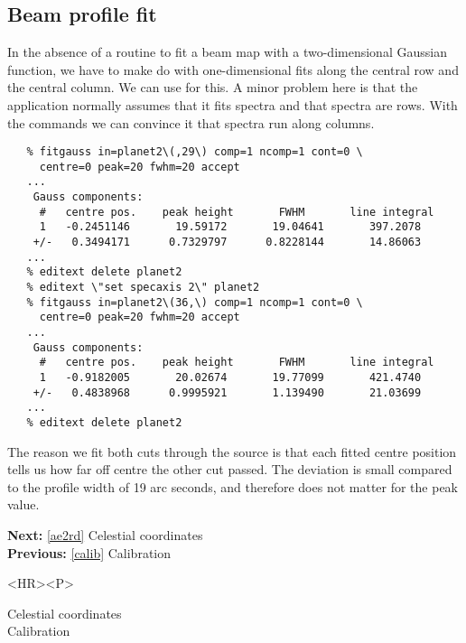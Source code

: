 \subsection{\label{beam}Beam profile fit}

   In the absence of a routine to fit a beam map with a two-dimensional
   Gaussian function, we have to make do with one-dimensional fits
   along the central row and the central column. We can use
{\tt {}}
   for this. A minor problem here is that the application normally
   assumes that it fits spectra and that spectra are rows. With the
{\tt {}}
   commands we can convince it that spectra run along columns.

\begin{verbatim}
   % fitgauss in=planet2\(,29\) comp=1 ncomp=1 cont=0 \
     centre=0 peak=20 fwhm=20 accept
   ...
    Gauss components:
     #   centre pos.    peak height       FWHM       line integral
     1   -0.2451146       19.59172       19.04641       397.2078
    +/-   0.3494171      0.7329797      0.8228144       14.86063
   ...
   % editext delete planet2
   % editext \"set specaxis 2\" planet2
   % fitgauss in=planet2\(36,\) comp=1 ncomp=1 cont=0 \
     centre=0 peak=20 fwhm=20 accept
   ...
    Gauss components:
     #   centre pos.    peak height       FWHM       line integral
     1   -0.9182005       20.02674       19.77099       421.4740
    +/-   0.4838968      0.9995921       1.139490       21.03699
   ...
   % editext delete planet2
\end{verbatim}

   The reason we fit both cuts through the source is that each fitted
   centre position tells us how far off centre the other cut passed. The
   deviation is small compared to the profile width of 19 arc seconds,
   and therefore does not matter for the peak value.

\begin{latexonly}
{\bf Next:} \ref{ae2rd} Celestial coordinates\\
{\bf Previous:} \ref{calib} Calibration\\
\end{latexonly}

\begin{htmlonly}
\begin{rawhtml} <HR><P> \end{rawhtml}
{\bf {}} Celestial coordinates\\
{\bf {}} Calibration\\
{\bf {}}\\
{\bf {}}\\
\end{htmlonly}


